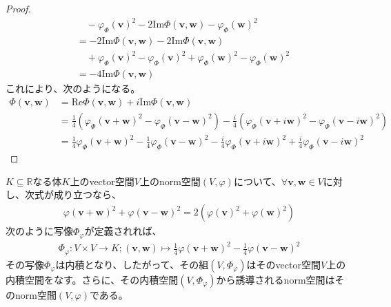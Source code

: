 \documentclass[dvipdfmx]{jsarticle}
\begin{document}
\begin{proof}
\begin{align*}
&\quad - {\varphi_{\varPhi}\left( \mathbf{v} \right)}^{2} - 2\mathrm{Im}{\varPhi\left( \mathbf{v},\mathbf{w} \right)} - {\varphi_{\varPhi}\left( \mathbf{w} \right)}^{2}\\
&= - 2\mathrm{Im}{\varPhi\left( \mathbf{v},\mathbf{w} \right)} - 2\mathrm{Im}{\varPhi\left( \mathbf{v},\mathbf{w} \right)} \\
&\quad + {\varphi_{\varPhi}\left( \mathbf{v} \right)}^{2} - {\varphi_{\varPhi}\left( \mathbf{v} \right)}^{2} + {\varphi_{\varPhi}\left( \mathbf{w} \right)}^{2} - {\varphi_{\varPhi}\left( \mathbf{w} \right)}^{2}\\
&= - 4\mathrm{Im}{\varPhi\left( \mathbf{v},\mathbf{w} \right)}
\end{align*}
これにより、次のようになる。
\begin{align*}
\varPhi\left( \mathbf{v},\mathbf{w} \right) &= \mathrm{Re}{\varPhi\left( \mathbf{v},\mathbf{w} \right)} + i\mathrm{Im}{\varPhi\left( \mathbf{v},\mathbf{w} \right)}\\
&= \frac{1}{4}\left( {\varphi_{\varPhi}\left( \mathbf{v} + \mathbf{w} \right)}^{2} - {\varphi_{\varPhi}\left( \mathbf{v} - \mathbf{w} \right)}^{2} \right) - \frac{i}{4}\left( {\varphi_{\varPhi}\left( \mathbf{v} + i\mathbf{w} \right)}^{2} - {\varphi_{\varPhi}\left( \mathbf{v} - i\mathbf{w} \right)}^{2} \right)\\
&= \frac{1}{4}{\varphi_{\varPhi}\left( \mathbf{v} + \mathbf{w} \right)}^{2} - \frac{1}{4}{\varphi_{\varPhi}\left( \mathbf{v} - \mathbf{w} \right)}^{2} - \frac{i}{4}{\varphi_{\varPhi}\left( \mathbf{v} + i\mathbf{w} \right)}^{2} + \frac{i}{4}{\varphi_{\varPhi}\left( \mathbf{v} - i\mathbf{w} \right)}^{2}
\end{align*}
\end{proof}
\begin{thm}\label{2.3.6.21}
$K \subseteq \mathbb{R}$なる体$K$上のvector空間$V$上のnorm空間$(V,\varphi)$について、$\forall\mathbf{v},\mathbf{w} \in V$に対し、次式が成り立つなら、
\begin{align*}
{\varphi\left( \mathbf{v} + \mathbf{w} \right)}^{2} + {\varphi\left( \mathbf{v} - \mathbf{w} \right)}^{2} = 2\left( {\varphi\left( \mathbf{v} \right)}^{2} + {\varphi\left( \mathbf{w} \right)}^{2} \right)
\end{align*}
次のように写像$\varPhi_{\varphi}$が定義されれば、
\begin{align*}
\varPhi_{\varphi}:V \times V \rightarrow K;\left( \mathbf{v},\mathbf{w} \right) \mapsto \frac{1}{4}{\varphi\left( \mathbf{v} + \mathbf{w} \right)}^{2} - \frac{1}{4}{\varphi\left( \mathbf{v} - \mathbf{w} \right)}^{2}
\end{align*}
その写像$\varPhi_{\varphi}$は内積となり、したがって、その組$\left( V,\varPhi_{\varphi} \right)$はそのvector空間$V$上の内積空間をなす。さらに、その内積空間$\left( V,\varPhi_{\varphi} \right)$から誘導されるnorm空間はそのnorm空間$(V,\varphi)$である。
\end{thm}
\end{document}
